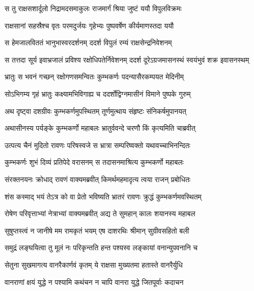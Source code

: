 
\twolineshloka
{स तु राक्षसशार्दूलो निद्रामदसमाकुलः}
{राजमार्गं श्रिया जुष्टं ययौ विपुलविक्रमः} %

\twolineshloka
{राक्षसानां सहस्रैश्च वृतः परमदुर्जयः}
{गृहेभ्यः पुष्पवर्षेण कीर्यमाणस्तदा ययौ} %

\twolineshloka
{स हेमजालविततं भानुभास्वरदर्शनम्}
{ददर्श विपुलं रम्यं राक्षसेन्द्रनिवेशनम्} %

\twolineshloka
{स तत्तदा सूर्य इवाभ्रजालं प्रविश्य रक्षोधिपतेर्निवेशनम्}
{ददर्श दूरेऽग्रजमासनस्थं स्वयंभुवं शक्र इवासनस्थम्} %

\twolineshloka
{भ्रातुः स भवनं गच्छन् रक्षोगणसमन्वितः}
{कुम्भकर्णः पदन्यासैरकम्पयत मेदिनीम्} %

\twolineshloka
{सोऽभिगम्य गृहं भ्रातुः कक्ष्यामभिविगाह्य च}
{ददर्शोद्विग्नमासीनं विमाने पुष्पके गुरुम्} %

\twolineshloka
{अथ दृष्ट्वा दशग्रीवः कुम्भकर्णमुपस्थितम्}
{तूर्णमुत्थाय संहृष्टः संनिकर्षमुपानयत्} %

\twolineshloka
{अथासीनस्य पर्यङ्के कुम्भकर्णो महाबलः}
{भ्रातुर्ववन्दे चरणौ किं कृत्यमिति चाब्रवीत्} %

\twolineshloka
{उत्पत्य चैनं मुदितो रावणः परिषस्वजे}
{स भ्रात्रा सम्परिष्वक्तो यथावच्चाभिनन्दितः} %

\twolineshloka
{कुम्भकर्णः शुभं दिव्यं प्रतिपेदे वरासनम्}
{स तदासनमाश्रित्य कुम्भकर्णो महाबलः} %

\twolineshloka
{संरक्तनयनः क्रोधाद् रावणं वाक्यमब्रवीत्}
{किमर्थमहमादृत्य त्वया राजन् प्रबोधितः} %

\twolineshloka
{शंस कस्माद् भयं तेऽत्र को वा प्रेतो भविष्यति}
{भ्रातरं रावणः क्रुद्धं कुम्भकर्णमवस्थितम्} %

\twolineshloka
{रोषेण परिवृत्ताभ्यां नेत्राभ्यां वाक्यमब्रवीत्}
{अद्य ते सुमहान् कालः शयानस्य महाबल} %

\twolineshloka
{सुषुप्तस्त्वं न जानीषे मम रामकृतं भयम्}
{एष दाशरथिः श्रीमान् सुग्रीवसहितो बली} %

\twolineshloka
{समुद्रं लङ्घयित्वा तु मूलं नः परिकृन्तति}
{हन्त पश्यस्व लङ्कायां वनान्युपवनानि च} %

\twolineshloka
{सेतुना सुखमागत्य वानरैकार्णवं कृतम्}
{ये राक्षसा मुख्यतमा हतास्ते वानरैर्युधि} %

\twolineshloka
{वानराणां क्षयं युद्धे न पश्यामि कथंचन}
{न चापि वानरा युद्धे जितपूर्वाः कदाचन} %

